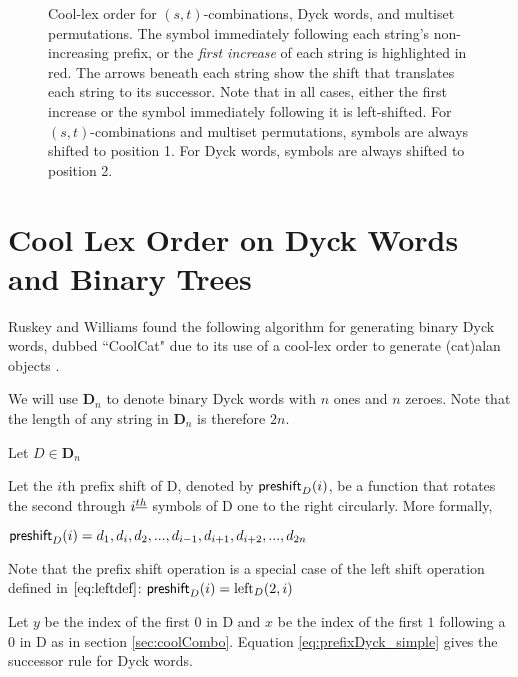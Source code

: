 \begin{figure}
\begin{center}
\end{center}
\caption{Cool-lex order for $(s,t)$-combinations, Dyck words, and multiset permutations. The symbol immediately following each string's non-increasing prefix, or the \emph{first increase} of each string is highlighted in red.  The arrows beneath each string show the shift that translates each string to its successor.  Note that in all cases, either the first increase or the symbol immediately following it is left-shifted.  For $(s,t)$-combinations and multiset permutations, symbols are always shifted to position 1.  For Dyck words, symbols are always shifted to position 2.}
\label{fig:coolAll}
\end{figure}

\section{Cool Lex Order on Dyck Words and Binary Trees} \label{sec:coolDyck}

Ruskey and Williams found the following algorithm for generating binary Dyck words, dubbed ``CoolCat" due to its use of a cool-lex order to generate (cat)alan objects \cite{ruskey2008generating}.

We will use $\mathbf{D}_n$ to denote binary Dyck words with $n$ ones and $n$ zeroes.  Note that the length of any string in $\mathbf{D}_n$ is therefore $2n$.

 Let $D \in \mathbf{D}_n$

 Let the $i$th prefix shift of D, denoted by $\preshift{D}{i}$, be a function that rotates the second through $i\thh$ symbols of D one to the right circularly.  More formally, 

 $\preshift{D}{i}=d_1,d_i,d_2,...,d_{i-1},d_{i+1},d_{i+2},...,d_{2n}$

 Note that the prefix shift operation is a special case of the left shift operation defined in $\ref{eq:leftdef}$: $\preshift{D}{i}=\lshiftindex[D]{2}{i}$




 Let $y$ be the index of the first $0$ in D and $x$ be the index of the first $1$ following a $0$ in D as in section \ref{sec:coolCombo}.
 Equation \ref{eq:prefixDyck_simple} gives the successor rule for Dyck words.

